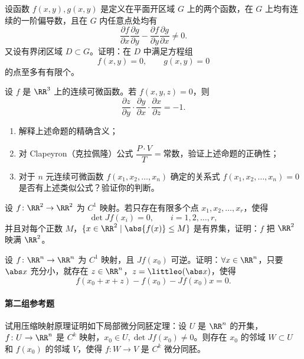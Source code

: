 \begin{xreferenceproblem}[8]
设函数 $f(x,y),g(x,y)$ 是定义在平面开区域 $G$ 上的两个函数，在 $G$ 上均有连续的一阶偏导数，且在 $G$ 内任意点处均有
  \[
    \frac{\partial f}{\partial x}\frac{\partial g}{\partial y}
    -\frac{\partial f}{\partial y}\frac{\partial g}{\partial x}\ne0.
  \]
  又设有界闭区域 $D\subset G$。证明：在 $D$ 中满足方程组
  \[
    f(x,y)=0,\qquad g(x,y)=0
  \]
  的点至多有有限个。
\end{xreferenceproblem}

\begin{xreferenceproblem}[9]
设 $f$ 是 $\RR^3$ 上的连续可微函数。若 $f(x,y,z)=0$，则
  \[
    \frac{\partial z}{\partial y}\cdot
    \frac{\partial y}{\partial x}\cdot
    \frac{\partial x}{\partial z}=-1.
  \]
  \begin{enumerate}[label=(\arabic*)]
    \item 解释上述命题的精确含义；
    \item 对 Clapeyron（克拉佩隆）公式 $\dfrac{P\cdot V}{T}=\text{常数}$，验证上述命题的正确性；
    \item 对于 $n$ 元连续可微函数 $f(x_1,x_2,\ldots,x_n)$ 确定的关系式 $f(x_1,x_2,\ldots,x_n)=0$ 是否有上述类似公式？验证你的判断。
  \end{enumerate}
\end{xreferenceproblem}

\begin{xreferenceproblem}[10]
设 $f\colon\RR^2\to\RR^2$ 为 $C^1$ 映射。若只存在有限多个点 $x_1,x_2,\ldots,x_r$，使得
  \[
    \det Jf(x_i)=0,\qquad i=1,2,\ldots,r,
  \]
  并且对每个正数 $M$，$\{x\in\RR^2\mid \abs{f(x)}\le M\}$ 是有界集，证明：$f$ 把 $\RR^2$ 映满 $\RR^2$。
\end{xreferenceproblem}

\begin{xreferenceproblem}[11]
设 $f\colon\RR^n\to\RR^n$ 为 $C^1$ 映射，且 $Jf(x_0)$ 可逆。证明：$\forall x\in\RR^n$，只要 $\abs x$ 充分小，就存在 $z\in\RR^n$，$z=\littleo(\abs x)$，使得
  \[
    f(x_0+x+z)-f(x_0)-Jf(x_0)x=0.
  \]
\end{xreferenceproblem}

\paragraph{第二组参考题}

\begin{xreferenceproblem}[1]
试用压缩映射原理证明如下局部微分同胚定理：设 $U$ 是 $\RR^n$ 的开集，$f\colon U\to\RR^n$ 是 $C^k$ 映射，$x_0\in U,\det Jf(x_0)\ne0$。则存在 $x_0$ 的邻域 $W\subset U$ 和 $f(x_0)$ 的邻域 $V$，使得 $f\colon W\to V$ 是 $C^k$ 微分同胚。
\end{xreferenceproblem}

